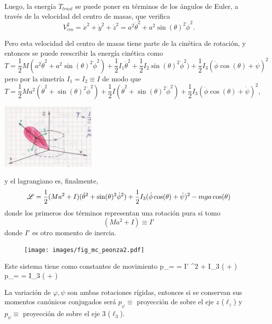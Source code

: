 \documentclass[10pt,oneside]{CBFT_book}
\begin{document}
Luego, la energía $T_{trasl}$ se puede poner en términos de los ángulos de Euler, a través de la velocidad del 
centro de masas, que verifica 
\[
	V_{cm}^2 = \dot{x}^2 + \dot{y}^2 + \dot{z}^2 = a^2 \dot{\theta}^2 + a^2 \sin(\theta)^2 \dot{\phi}^2.
\]

Pero esta velocidad del centro de masas tiene parte de la cinética de rotación, y entonces se puede reescribir
la energía cinética como 
\[
	T = \frac{1}{2} M (a^2 \dot{\theta}^2 + a^2 \sin(\theta)^2 \dot{\phi}^2) + \frac{1}{2} I_1 \dot{\theta}^2
	+ \frac{1}{2} I_2 \sin(\theta)^2 \dot{\phi}^2) + \frac{1}{2} I_3 (\dot{\phi} \cos(\theta) + \dot{\psi})^2 
\]
pero por la simetría $I_1=I_2\equiv I$ de modo que 
\[
	T = \frac{1}{2} M a^2 (\dot{\theta}^2 + \sin(\theta)^2 \dot{\phi}^2) + \frac{1}{2} I ( \dot{\theta}^2 +
	\sin(\theta)^2 \dot{\phi}^2 ) + \frac{1}{2} I_3 (\dot{\phi} \cos(\theta) + \dot{\psi})^2, 
\]

\includegraphics[width=0.35\textwidth]{images/fig_mc_peonza_segunda_3.jpg}

y el lagrangiano es, finalmente,
\[
	\mathscr{L} = \frac{1}{2} ( M a^2 + I ) (\dot{\theta}^2 + \sin(\theta)^2 \dot{\phi}^2) +  
		\frac{1}{2} I_3 (\dot{\phi} \cos(\theta) + \dot{\psi})^2  - m g a \cos(\theta)
\]
donde los primeros dos términos representan una rotación pura si tomo 
\[
	( M a^2 + I ) \equiv I' 
\]
donde $I'$ es otro momento de inercia.
\begin{figure}[htb]
	\begin{center}
	\texttt{[image: images/fig\_mc\_peonza2.pdf]}	 
	\end{center}
	\caption{}
\end{figure} 

Este sistema tiene como constantes de movimiento
\be
	p_\varphi = \dpar{\Lag}{\dot{\varphi}} = I' \sin^2 \theta \dot{ \varphi } +
	I_3 (  \dot{\psi} + \dot{\varphi} \cos \theta ) \cos \theta
	\label{lz}
\ee
\be
	p_\psi = \dpar{\Lag}{\dot{\psi}} = I_3 (  \dot{\psi} + \dot{\varphi} \cos \theta )
	\label{l3}
\ee

La variación de $\varphi,\psi$ son ambas rotaciones rígidas, entonces si se conservan sus momentos
canónicos conjugados será $p_\varphi \equiv$ proyección de  sobre el eje $z$ ($\ell_z$) y
$p_\psi \equiv$ proyección de  sobre el eje $3$ ($\ell_3$).
\end{document}
